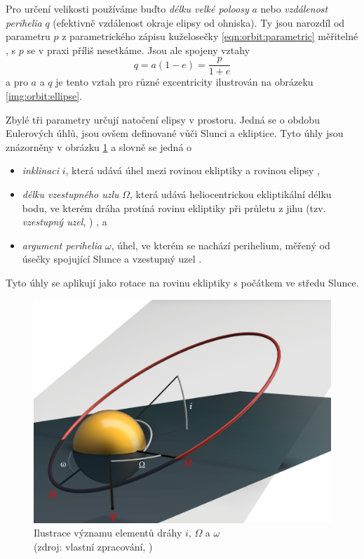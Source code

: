 Pro určení velikosti používáme buďto \textit{délku velké poloosy} $a$ nebo \textit{vzdálenost perihelia} $q$ (efektivně vzdálenost okraje elipsy od ohniska). Ty jsou narozdíl od parametru $p$ z parametrického zápisu kuželosečky \eqref{eqn:orbit:parametric} měřitelné \cite{dsh}, s $p$ se v praxi příliš nesetkáme. Jsou ale spojeny vztahy
$$
    q=a(1-e)=\frac{p}{1+e}
$$
a pro $a$ a $q$ je tento vztah pro různé excentricity ilustrován na obrázeku \ref{img:orbit:ellipse}.

\medskip

Zbylé tři parametry určují natočení elipsy v prostoru. Jedná se o obdobu Eulerových úhlů, jsou ovšem definované vůči Slunci a ekliptice. Tyto úhly jsou znázorněny v obrázku \ref{img:orbit:elements} a slovně se jedná o
\begin{itemize}
    \item \textit{inklinaci} $i$, která udává úhel mezi rovinou ekliptiky a rovinou elipsy \cite{astro},
    \item \textit{délku vzestupného uzlu} $\Omega$, která udává heliocentrickou ekliptikální délku bodu, ve kterém dráha protíná rovinu ekliptiky při průletu z jihu (tzv. \textit{vzestupný uzel}, \NorthNode) \cite{astro}, a
    \item \textit{argument perihelia} $\omega$, úhel, ve kterém se nachází perihelium, měřený od úsečky spojující Slunce a vzestupný uzel \cite{astro}.
\end{itemize}
Tyto úhly se aplikují jako rotace na rovinu ekliptiky s počátkem ve středu Slunce.

\begin{figure}[ht]
    \centering
    \includegraphics[width=0.8\linewidth]{img/orbital-elements/orbit-elements-marked.png}
    \caption[Ilustrace významu elementů dráhy $i$, $\Omega$ a $\omega$]{
    Ilustrace významu elementů dráhy $i$, $\Omega$ a $\omega$\\
    {\small (zdroj: vlastní zpracování, \cite{astro})}
    }
    \label{img:orbit:elements}
\end{figure}

